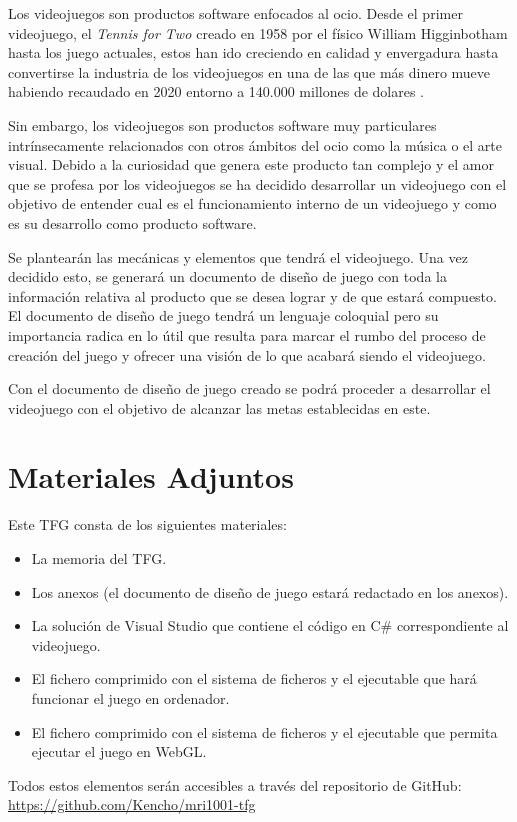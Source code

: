
Los videojuegos son productos software enfocados al ocio. Desde el primer videojuego, el \textit{Tennis for Two \cite{Tennis4two}} creado en 1958 por el físico William Higginbotham hasta los juego actuales, estos han ido creciendo en calidad y envergadura hasta convertirse la industria de los videojuegos en una de las que más dinero mueve habiendo recaudado en 2020 entorno a 140.000 millones de dolares \cite{2020GamesMoney}.

Sin embargo, los videojuegos son productos software muy particulares intrínsecamente relacionados con otros ámbitos del ocio como la música o el arte visual. Debido a la curiosidad que genera este producto tan complejo y el amor que se profesa por los videojuegos se ha decidido desarrollar un videojuego con el objetivo de entender cual es el funcionamiento interno de un videojuego y como es su desarrollo como producto software.

Se plantearán las mecánicas y elementos que tendrá el videojuego. Una vez decidido esto, se generará un documento de diseño de juego con toda la información relativa al producto que se desea lograr y de que estará compuesto. El documento de diseño de juego tendrá un lenguaje coloquial pero su importancia radica en lo útil que resulta para marcar el rumbo del proceso de creación del juego y ofrecer una visión de lo que acabará siendo el videojuego.

Con el documento de diseño de juego creado se podrá proceder a desarrollar el videojuego con el objetivo de alcanzar las metas establecidas en este.

\section{Materiales Adjuntos}
Este TFG consta de los siguientes materiales:
\begin{itemize}
\item
La memoria del TFG.
\item
Los anexos (el documento de diseño de juego estará redactado en los anexos).
\item
La solución de Visual Studio que contiene el código en C\# correspondiente al videojuego.
\item
El fichero comprimido con el sistema de ficheros y el ejecutable que hará funcionar el juego en ordenador.
\item
El fichero comprimido con el sistema de ficheros y el ejecutable que permita ejecutar el juego en WebGL.
\end{itemize}

Todos estos elementos serán accesibles a través del repositorio de GitHub: \url{https://github.com/Kencho/mri1001-tfg}
